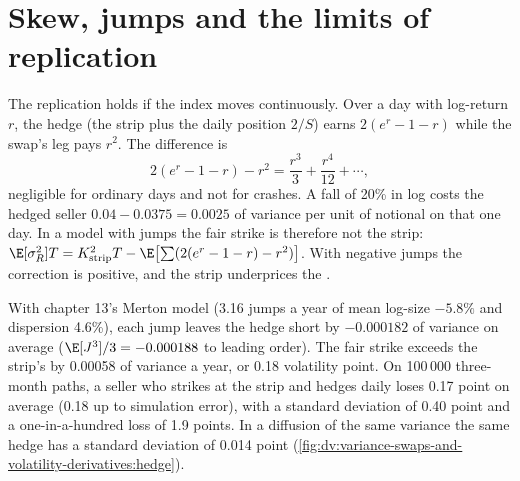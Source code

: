 \section{Skew, jumps and the limits of replication}

The replication holds if the index moves continuously. Over a day with log-return $r$, the hedge (the strip
plus the daily position $2/S$) earns $2(e^r-1-r)$ while the swap's leg pays $r^2$. The difference is
\[
2(e^r-1-r)-r^2=\frac{r^3}3+\frac{r^4}{12}+\cdots,
\]
negligible for ordinary days and not for crashes. A fall of 20\% in log costs the hedged seller
$0.04-0.0375=0.0025$ of variance per unit of notional on that one day. In a model with jumps the fair strike is
therefore not the strip: $\E[\sigma_R^2]T=K_{\mathrm{strip}}^2T-\E\bigl[\sum(2(e^r-1-r)-r^2)\bigr]$. With negative
jumps the correction is positive, and the strip underprices the .

\begin{example}\label{ex:dv:variance-swaps-and-volatility-derivatives:jumps}
With chapter 13's Merton model (3.16 jumps a year of mean log-size $-5.8\%$ and dispersion 4.6\%), each jump
leaves the hedge short by $-0.000182$ of variance on average ($\E[J^3]/3=-0.000188$ to leading order). The fair
strike exceeds the strip's by 0.00058 of variance a year, or 0.18 volatility point. On 100\,000 three-month paths,
a seller who strikes at the strip and hedges daily loses 0.17 point on average (0.18 up to simulation error), with a standard deviation of 0.40
point and a one-in-a-hundred loss of 1.9 points. In a diffusion of the same variance the same hedge has a
standard deviation of 0.014 point (\cref{fig:dv:variance-swaps-and-volatility-derivatives:hedge}).
\end{example}

